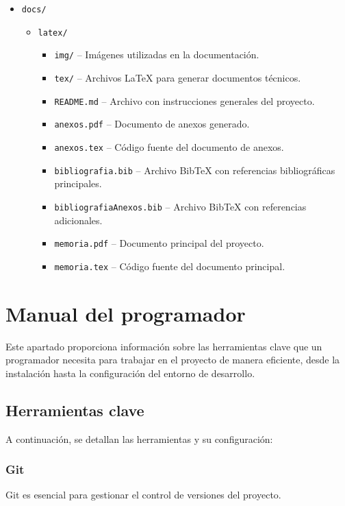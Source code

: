 \begin{itemize}
	\item \texttt{docs/}
	\begin{itemize}
		\item \texttt{latex/}
		\begin{itemize}
   			\item \texttt{img/} -- Imágenes utilizadas en la documentación.
    			\item \texttt{tex/} -- Archivos \LaTeX{} para generar documentos técnicos.
    			\item \texttt{README.md} -- Archivo con instrucciones generales del proyecto.
    			\item \texttt{anexos.pdf} -- Documento de anexos generado.
    			\item \texttt{anexos.tex} -- Código fuente del documento de anexos.
    			\item \texttt{bibliografia.bib} -- Archivo BibTeX con referencias bibliográficas principales.
    			\item \texttt{bibliografiaAnexos.bib} -- Archivo BibTeX con referencias adicionales.
    			\item \texttt{memoria.pdf} -- Documento principal del proyecto.
    			\item \texttt{memoria.tex} -- Código fuente del documento principal.
		\end{itemize}
	\end{itemize}
\end{itemize}


\section{Manual del programador}

Este apartado proporciona información sobre las herramientas clave que un programador necesita para trabajar en el proyecto de manera eficiente, desde la instalación hasta la configuración del entorno de desarrollo.

\subsection{Herramientas clave}

A continuación, se detallan las herramientas y su configuración:

\subsubsection{Git}
Git es esencial para gestionar el control de versiones del proyecto.

